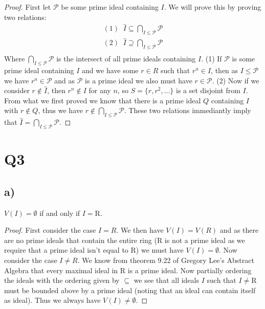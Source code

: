 \documentclass{article}
\theoremstyle{definition}
\begin{document}
\begin{proof}
First let $\mathcal{P}$ be some prime ideal containing $I$. We will prove this by proving two relations:
\begin{align*}
(1)\;\;\hat{I}\subseteq\bigcap_{I\leq\mathcal{P}}\mathcal{P}\\
(2)\;\;\hat{I}\supseteq\bigcap_{I\leq\mathcal{P}}\mathcal{P}\\
\end{align*}
Where $\bigcap_{I\leq\mathcal{P}}\mathcal{P}$ is the intersect of all prime ideals containing $I$.
\newline\newline
(1)
\newline
If $\mathcal{P}$ is some prime ideal containing $I$ and we have some $r\in R$ such that $r^n\in I$, then as $I\leq\mathcal{P}$ we have $r^n\in\mathcal{P}$ and as $\mathcal{P}$ is a prime ideal we also must have $r\in\mathcal{P}$.
\newline\newline
(2)
\newline
Now if we consider $r\notin\hat{I}$, then $r^n\notin I$ for any $n$, so $S=\{r,r^2,...\}$ is a set disjoint from $I$. From what we first proved we know that there is a prime ideal $Q$ containing $I$ with $r\notin Q$, thus we have $r\notin\bigcap_{I\leq\mathcal{P}}\mathcal{P}$.
\newline\newline
These two relations immediantly imply that $\hat{I}=\bigcap_{I\leq\mathcal{P}}\mathcal{P}$.
\end{proof}
\section*{Q3}
\subsection*{a)}
$V(I)=\emptyset$ if and only if $I=$R.
\begin{proof}
First consider the case $I=R$. 
\newline
We then have $V(I)=V(R)$ and as there are no prime ideals that contain the entire ring (R is not a prime ideal as we require that a prime ideal isn't equal to R) we must have $V(I)=\emptyset$.
\newline\newline
Now consider the case $I\neq R$.
\newline
We know from theorem 9.22 of Gregory Lee's Abstract Algebra that every maximal ideal in R is a prime ideal. Now partially ordering the ideals with the ordering given by $\subseteq$ we see that all ideals $I$ such that $I\neq$R must be bounded above by a prime ideal (noting that an ideal can contain itself as ideal). Thus we always have $V(I)\neq\emptyset$.
\end{proof}
\end{document}

